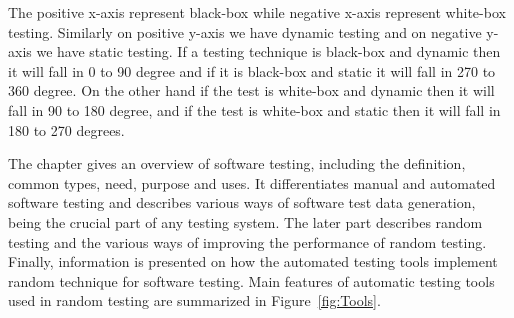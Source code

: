 The positive x-axis represent black-box while negative x-axis represent white-box testing. Similarly on positive y-axis we have dynamic testing and on negative y-axis we have static testing. If a testing technique is black-box and dynamic then it will fall in 0 to 90 degree and if it is black-box and static it will fall in 270 to 360 degree. On the other hand if the test is white-box and dynamic then it will fall in 90 to 180 degree, and if the test is white-box and static then it will fall in 180 to 270 degrees.

The chapter gives an overview of software testing, including the definition, common types, need, purpose and uses. It differentiates manual and automated software testing and describes various ways of software test data generation, being the crucial part of any testing system. The later part describes random testing and the various ways of improving the performance of random testing. Finally, information is presented on how the automated testing tools implement random technique for software testing. Main features of automatic testing tools used in random testing are summarized in Figure~\ref{fig:Tools}.











